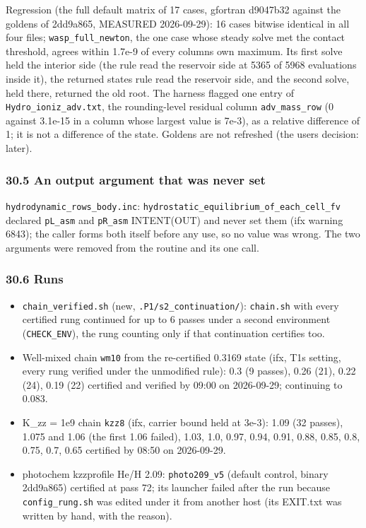 \documentclass[english,a4paper]{my_memo}
\providecommand{\tightlist}{\setlength{\itemsep}{0pt}\setlength{\parskip}{0pt}}
\begin{document}
Regression (the full default matrix of 17 cases, gfortran d9047b32 against
the goldens of 2dd9a865, MEASURED 2026-09-29): 16 cases bitwise identical
in all four files; \texttt{wasp\_full\_newton}, the one case whose steady solve met
the contact threshold, agrees within 1.7e-9 of every column\textquotesingle s own maximum.
Its first solve held the interior side (the rule read the reservoir side at
5365 of 5968 evaluations inside it), the returned state\textquotesingle s rule read the
reservoir side, and the second solve, held there, returned the old root.
The harness flagged one entry of \texttt{Hydro\_ioniz\_adv.txt}, the rounding-level
residual column \texttt{adv\_mass\_row} (0 against 3.1e-15 in a column whose largest
value is 7e-3), as a relative difference of 1; it is not a difference of
the state. Goldens are not refreshed (the user\textquotesingle s decision: later).

\subsubsection{30.5 An output argument that was never set}\label{305-an-output-argument-that-was-never-set}

\texttt{hydrodynamic\_rows\_body.inc}: \texttt{hydrostatic\_equilibrium\_of\_each\_cell\_fv}
declared \texttt{pL\_asm} and \texttt{pR\_asm} INTENT(OUT) and never set them (ifx warning
6843); the caller forms both itself before any use, so no value was wrong.
The two arguments were removed from the routine and its one call.

\subsubsection{30.6 Runs}\label{306-runs}

\begin{itemize}
\tightlist
\item
  \texttt{chain\_verified.sh} (new, \texttt{.P1/s2\_continuation/}): \texttt{chain.sh} with every
  certified rung continued for up to 6 passes under a second environment
  (\texttt{CHECK\_ENV}), the rung counting only if that continuation certifies too.
\item
  Well-mixed chain \texttt{wm10} from the re-certified 0.3169 state (ifx, T1\textquotesingle s
  setting, every rung verified under the unmodified rule): 0.3 (9 passes),
  0.26 (21), 0.22 (24), 0.19 (22) certified and verified by 09:00 on
  2026-09-29; continuing to 0.083.
\item
  K\_zz = 1e9 chain \texttt{kzz8} (ifx, carrier bound held at 3e-3): 1.09 (32
  passes), 1.075 and 1.06 (the first 1.06 failed), 1.03, 1.0, 0.97, 0.94,
  0.91, 0.88, 0.85, 0.8, 0.75, 0.7, 0.65 certified by 08:50 on 2026-09-29.
\item
  photochem kzzprofile He/H 2.09: \texttt{photo209\_v5} (default control, binary
  2dd9a865) certified at pass 72; its launcher failed after the run because
  \texttt{config\_rung.sh} was edited under it from another host (its EXIT.txt was
  written by hand, with the reason).
\end{itemize}
\end{document}
